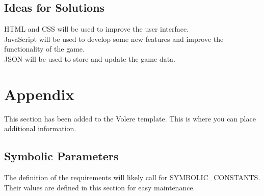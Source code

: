 \documentclass[12pt, titlepage]{article}
\begin{document}
\subsection{Ideas for Solutions}

HTML and CSS will be used to improve the user interface. \\
JavaScript will be used to develop some new features and improve the functionality of the game. \\
JSON will be used to store and update the game data. \\






\newpage

\section{Appendix}

This section has been added to the Volere template.  This is where you can place
additional information.

\subsection{Symbolic Parameters}

The definition of the requirements will likely call for SYMBOLIC\_CONSTANTS.
Their values are defined in this section for easy maintenance.
\end{document}
